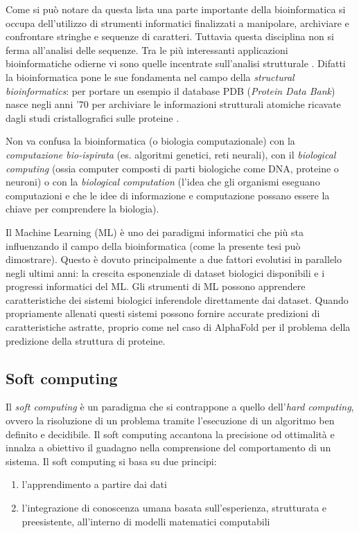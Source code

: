 \par Come si può notare da questa lista una parte importante della bioinformatica si occupa dell'utilizzo di strumenti informatici finalizzati a manipolare, archiviare e confrontare stringhe e sequenze di caratteri. Tuttavia questa disciplina non si ferma all’analisi delle sequenze. Tra le più interessanti applicazioni bioinformatiche odierne vi sono quelle incentrate sull’analisi strutturale \supercite{baxevanis2020bioinformatics}. Difatti la bioinformatica pone le sue fondamenta nel campo della \textit{structural bioinformatics}: per portare un esempio il database PDB (\textit{Protein Data Bank}) nasce negli anni '70 per archiviare le informazioni strutturali atomiche ricavate dagli studi cristallografici sulle proteine \supercite{bernstein77}.

\par Non va confusa la bioinformatica (o biologia computazionale) con la \textit{computazione bio-ispirata} (es. algoritmi genetici, reti neurali), con il \textit{biological computing} (ossia computer composti di parti biologiche come DNA, proteine o neuroni) o con la \textit{biological computation} (l'idea che gli organismi eseguano computazioni e che le idee di informazione e computazione possano essere la chiave per comprendere la biologia)\supercite{Mitchell2010}.

\par Il Machine Learning (ML) è uno dei paradigmi informatici che più sta influenzando il campo della bioinformatica (come la presente tesi può dimostrare). Questo è dovuto principalmente a due fattori evolutisi in parallelo negli ultimi anni: la crescita esponenziale di dataset biologici disponibili e i progressi informatici del ML. Gli strumenti di ML possono apprendere caratteristiche dei sistemi biologici inferendole direttamente dai dataset. Quando propriamente allenati questi sistemi possono fornire accurate predizioni di caratteristiche astratte, proprio come nel caso di AlphaFold per il problema della predizione della struttura di proteine.

\subsection{Soft computing}
Il \textit{soft computing} è un paradigma che si contrappone a quello dell'\textit{hard computing}, ovvero la risoluzione di un problema tramite l'esecuzione di un algoritmo ben definito e decidibile. Il soft computing accantona la precisione od ottimalità e innalza a obiettivo il guadagno nella comprensione del comportamento di un sistema. Il soft computing si basa su due principi: 
\begin{enumerate}
	\item l'apprendimento a partire dai dati
	\item l'integrazione di conoscenza umana basata sull'esperienza, strutturata e preesistente, all'interno di modelli matematici computabili
\end{enumerate}

